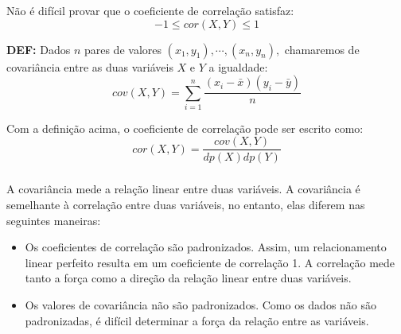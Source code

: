 \documentclass[14pt,aspectratio=1610]{beamer}
\begin{document}
\begin{frame}{}
\frametitle{}
\vspace{-0.6cm}
\begin{block}{}
\justifying
Não é difícil provar que o coeficiente de correlação satisfaz:
$$-1\leq cor(X,Y)\leq 1$$
\end{block}
\pause
\begin{block}{}
\justifying
{\bf DEF:} Dados $n$ pares de valores $(x_{1}, y_{1}), \cdots, (x_{n}, y_{n}),$ chamaremos de covariância entre as duas variáveis $X$ e $Y$ a igualdade:
$$cov(X,Y)={\displaystyle \sum_{i=1}^{n}\dfrac{(x_{i}-\bar{x})(y_{i}-\bar{y})}{n}}$$
\end{block}
\pause
\vspace{-0.8cm}
\begin{block}{}
\justifying
Com a definição acima, o coeficiente de correlação pode ser escrito como:
$$cor(X,Y)=\dfrac{cov(X,Y)}{dp(X)dp(Y)}$$
\end{block}
\end{frame}

\begin{frame}{}
\frametitle{}
A covariância mede a relação linear entre duas variáveis. A covariância é semelhante à correlação entre duas variáveis, no entanto, elas diferem nas seguintes maneiras:
\begin{itemize}
\item Os coeficientes de correlação são padronizados. Assim, um relacionamento linear perfeito resulta em um coeficiente de correlação 1. A correlação mede tanto a força como a direção da relação linear entre duas variáveis.\pause
\item Os valores de covariância não são padronizados. Como os dados não são padronizadas, é difícil determinar a força da relação entre as variáveis.
\end{itemize}
\end{frame}
\end{document}
